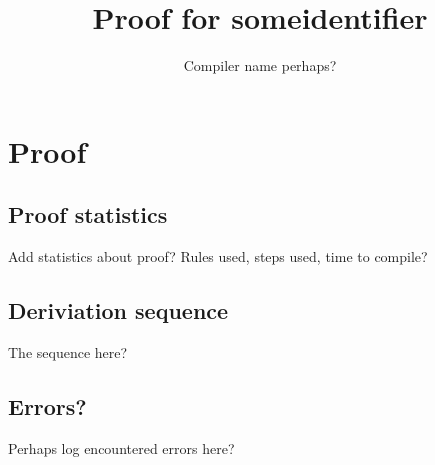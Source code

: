 \documentclass{article}
\begin{document}
\title{Proof for someidentifier}
\author{Compiler name perhaps?}

\maketitle

\section{Proof}
\subsection{Proof statistics}
Add statistics about proof? Rules used, steps used, time to compile?

\subsection{Deriviation sequence}
The sequence here?

\subsection{Errors?}
Perhaps log encountered errors here?
\end{document}
